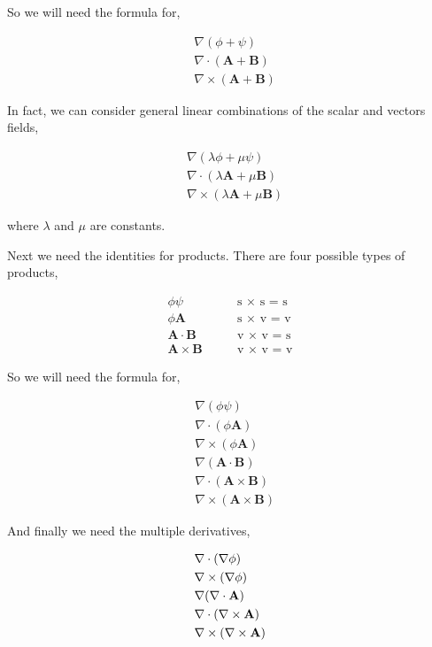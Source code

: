 \documentclass[11pt]{amsart}
\begin{document}
So we will need the formula for,

\begin{align*}
  &\nabla(\phi + \psi) \\
  &\nabla \cdot (\mathbf{A} + \mathbf{B}) \\
  &\nabla \times (\mathbf{A} + \mathbf{B})
\end{align*}

In fact, we can consider general linear combinations of the scalar and vectors fields,

\begin{align}
  \label{eq:1}
  &\nabla(\lambda \phi + \mu \psi) \\
  \label{eq:2}
  &\nabla \cdot (\lambda \mathbf{A} + \mu \mathbf{B}) \\
  \label{eq:3}
  &\nabla \times (\lambda \mathbf{A} + \mu \mathbf{B})
\end{align}

where $\lambda$ and $\mu$ are constants.

Next we need the identities for products. There are four possible types of products,

\begin{align*}
  \phi\psi \qquad &\text{s $\times$ s = s} \\
  \phi\mathbf{A} \qquad &\text{s $\times$ v = v} \\
  \mathbf{A} \cdot \mathbf{B} \qquad &\text{v $\times$ v = s} \\
  \mathbf{A} \times \mathbf{B} \qquad &\text{v $\times$ v = v}
\end{align*}

So we will need the formula for,

\begin{align}
  \label{eq:4}
  &\nabla(\phi\psi) \\
  \label{eq:5}
  &\nabla\cdot(\phi\mathbf{A}) \\
  \label{eq:6}
  &\nabla\times(\phi\mathbf{A}) \\
  \label{eq:7}
  &\nabla(\mathbf{A}\cdot\mathbf{B}) \\
  \label{eq:8}
  &\nabla\cdot(\mathbf{A}\times\mathbf{B}) \\
  \label{eq:9}
  &\nabla\times(\mathbf{A}\times\mathbf{B})
\end{align}

And finally we need the multiple derivatives,

\begin{align}
  \label{eq:10}
  &\nabla\cdot(\nabla\phi) \\
  \label{eq:11}
  &\nabla\times(\nabla\phi) \\
  &\nabla(\nabla\cdot\mathbf{A}) \notag\\
  \label{eq:12}
  &\nabla\cdot(\nabla\times\mathbf{A}) \\
  \label{eq:13}
  &\nabla\times(\nabla\times\mathbf{A})
\end{align}
\end{document}
